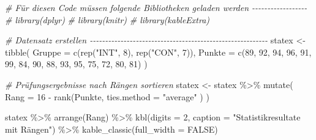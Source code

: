 \documentclass[
]{book}
\newenvironment{Shaded}{\begin{snugshade}}{\end{snugshade}}
\newcommand{\AttributeTok}[1]{\textcolor[rgb]{0.77,0.63,0.00}{#1}}
\newcommand{\CommentTok}[1]{\textcolor[rgb]{0.56,0.35,0.01}{\textit{#1}}}
\newcommand{\ConstantTok}[1]{\textcolor[rgb]{0.00,0.00,0.00}{#1}}
\newcommand{\DecValTok}[1]{\textcolor[rgb]{0.00,0.00,0.81}{#1}}
\newcommand{\FunctionTok}[1]{\textcolor[rgb]{0.00,0.00,0.00}{#1}}
\newcommand{\NormalTok}[1]{#1}
\newcommand{\OtherTok}[1]{\textcolor[rgb]{0.56,0.35,0.01}{#1}}
\newcommand{\SpecialCharTok}[1]{\textcolor[rgb]{0.00,0.00,0.00}{#1}}
\newcommand{\StringTok}[1]{\textcolor[rgb]{0.31,0.60,0.02}{#1}}
\begin{document}
\begin{Shaded}
\begin{Highlighting}[]
\CommentTok{\# Für diesen Code müssen folgende Bibliotheken geladen werden {-}{-}{-}{-}{-}{-}{-}{-}{-}{-}{-}{-}{-}{-}{-}{-}{-}{-}}
\CommentTok{\# library(dplyr)}
\CommentTok{\# library(knitr)}
\CommentTok{\# library(kableExtra)}

\CommentTok{\# Datensatz erstellen {-}{-}{-}{-}{-}{-}{-}{-}{-}{-}{-}{-}{-}{-}{-}{-}{-}{-}{-}{-}{-}{-}{-}{-}{-}{-}{-}{-}{-}{-}{-}{-}{-}{-}{-}{-}{-}{-}{-}{-}{-}{-}{-}{-}{-}{-}{-}{-}{-}{-}{-}{-}{-}{-}{-}{-}{-}{-}}
\NormalTok{statex }\OtherTok{\textless{}{-}} \FunctionTok{tibble}\NormalTok{(}
  \AttributeTok{Gruppe =} \FunctionTok{c}\NormalTok{(}\FunctionTok{rep}\NormalTok{(}\StringTok{"INT"}\NormalTok{, }\DecValTok{8}\NormalTok{), }\FunctionTok{rep}\NormalTok{(}\StringTok{"CON"}\NormalTok{, }\DecValTok{7}\NormalTok{)),}
  \AttributeTok{Punkte =} \FunctionTok{c}\NormalTok{(}\DecValTok{89}\NormalTok{, }\DecValTok{92}\NormalTok{, }\DecValTok{94}\NormalTok{, }\DecValTok{96}\NormalTok{, }\DecValTok{91}\NormalTok{, }\DecValTok{99}\NormalTok{, }\DecValTok{84}\NormalTok{, }\DecValTok{90}\NormalTok{, }\DecValTok{88}\NormalTok{, }\DecValTok{93}\NormalTok{, }\DecValTok{95}\NormalTok{, }\DecValTok{75}\NormalTok{, }\DecValTok{72}\NormalTok{, }\DecValTok{80}\NormalTok{, }\DecValTok{81}\NormalTok{)}
\NormalTok{)}

\CommentTok{\# Prüfungsergebnisse nach Rängen sortieren  }
\NormalTok{statex }\OtherTok{\textless{}{-}}\NormalTok{ statex }\SpecialCharTok{\%\textgreater{}\%} 
  \FunctionTok{mutate}\NormalTok{(}
    \AttributeTok{Rang =} \DecValTok{16} \SpecialCharTok{{-}} \FunctionTok{rank}\NormalTok{(Punkte, }\AttributeTok{ties.method =} \StringTok{"average"}\NormalTok{ )}
\NormalTok{  )}

\NormalTok{statex }\SpecialCharTok{\%\textgreater{}\%} 
  \FunctionTok{arrange}\NormalTok{(Rang) }\SpecialCharTok{\%\textgreater{}\%} 
  \FunctionTok{kbl}\NormalTok{(}\AttributeTok{digits =} \DecValTok{2}\NormalTok{, }\AttributeTok{caption =} \StringTok{"Statistikresultate mit Rängen"}\NormalTok{) }\SpecialCharTok{\%\textgreater{}\%} 
  \FunctionTok{kable\_classic}\NormalTok{(}\AttributeTok{full\_width =} \ConstantTok{FALSE}\NormalTok{)}
\end{Highlighting}
\end{Shaded}
\end{document}
